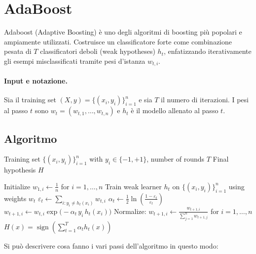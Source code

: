 \section{AdaBoost}
Adaboost (Adaptive Boosting) è uno degli algoritmi di boosting più popolari e ampiamente utilizzati. Costruisce un classificatore forte come combinazione pesata di $T$ classificatori deboli (weak hypotheses) $h_t$, enfatizzando iterativamente gli esempi misclassificati tramite pesi d'istanza $w_{t,i}$.

\paragraph{Input e notazione.}
Sia il training set $(X,y)=\{(x_i,y_i)\}_{i=1}^n$ e sia $T$ il numero di iterazioni.
I pesi al passo $t$ sono $w_t=(w_{t,1},\dots,w_{t,n})$ e $h_t$ è il modello allenato al passo $t$.

\subsection{Algoritmo}

\begin{algorithm}[htbp]
\caption{AdaBoost}
\begin{algorithmic}[1]
\Require Training set $\{(x_i,y_i)\}_{i=1}^n$ with $y_i\in\{-1,+1\}$, number of rounds $T$
\Ensure Final hypothesis $H$

\State Initialize $w_{1,i} \gets \frac{1}{n}$ for $i=1,\ldots,n$
    \State Train weak learner $h_t$ on $\{(x_i,y_i)\}_{i=1}^n$ using weights $w_t$
    \State $\varepsilon_t \gets \sum_{i: y_i \neq h_t(x_i)} w_{t,i}$
    \State $\alpha_t \gets \frac{1}{2}\ln\left(\frac{1-\varepsilon_t}{\varepsilon_t}\right)$
        \State $w_{t+1,i} \gets w_{t,i}\exp\!\big(-\alpha_t\,y_i\,h_t(x_i)\big)$
    \EndFor
    \State Normalize: $w_{t+1,i} \gets \frac{w_{t+1,i}}{\sum_{j=1}^n w_{t+1,j}}$ for $i=1,\ldots,n$
\EndFor
\State \Return $H(x) = \operatorname{sign}\left(\sum_{t=1}^T \alpha_t h_t(x)\right)$
\end{algorithmic}
\end{algorithm}

\noindent
Si può descrivere cosa fanno i vari passi dell'algoritmo in questo modo:


